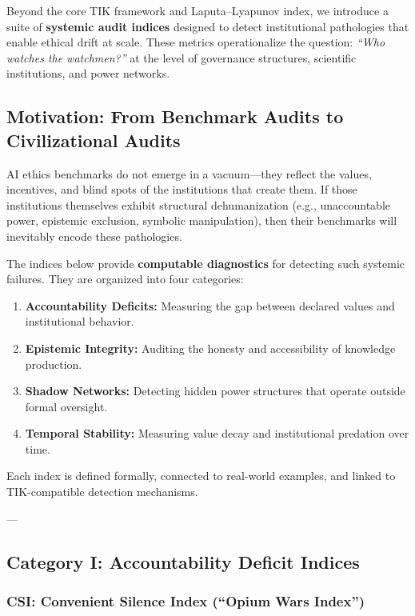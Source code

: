 \documentclass[11pt,a4paper]{article}
\theoremstyle{definition}
\theoremstyle{remark}
\begin{document}
Beyond the core TIK framework and Laputa–Lyapunov index, we introduce a suite of \textbf{systemic audit indices} designed to detect institutional pathologies that enable ethical drift at scale. These metrics operationalize the question: \textit{``Who watches the watchmen?''} at the level of governance structures, scientific institutions, and power networks.

\subsection{Motivation: From Benchmark Audits to Civilizational Audits}

AI ethics benchmarks do not emerge in a vacuum—they reflect the values, incentives, and blind spots of the institutions that create them. If those institutions themselves exhibit structural dehumanization (e.g., unaccountable power, epistemic exclusion, symbolic manipulation), then their benchmarks will inevitably encode these pathologies.

The indices below provide \textbf{computable diagnostics} for detecting such systemic failures. They are organized into four categories:
\begin{enumerate}
\item \textbf{Accountability Deficits:} Measuring the gap between declared values and institutional behavior.
\item \textbf{Epistemic Integrity:} Auditing the honesty and accessibility of knowledge production.
\item \textbf{Shadow Networks:} Detecting hidden power structures that operate outside formal oversight.
\item \textbf{Temporal Stability:} Measuring value decay and institutional predation over time.
\end{enumerate}

Each index is defined formally, connected to real-world examples, and linked to TIK-compatible detection mechanisms.

---

\subsection{Category I: Accountability Deficit Indices}

\subsubsection{CSI: Convenient Silence Index (``Opium Wars Index'')}
\end{document}
